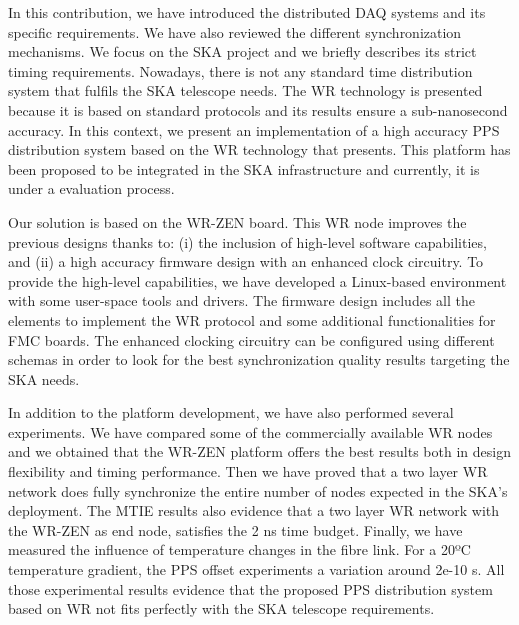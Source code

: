 In this contribution, we have introduced the distributed DAQ systems and its 
specific requirements. We have also reviewed the different synchronization 
mechanisms. We focus on the SKA project and we briefly describes its strict 
timing requirements. Nowadays, there is not any standard time distribution 
system that fulfils the SKA telescope needs. The WR technology is presented 
because it is based on standard protocols and its results ensure a 
sub-nanosecond accuracy. In this context, we present an implementation of a 
high accuracy PPS distribution system based on the WR technology that presents. 
This platform has been proposed to be integrated in the SKA infrastructure and 
currently, it is under a evaluation process. 

Our solution is based on the WR-ZEN board. This WR node improves the previous  
designs thanks to: (i) the inclusion of high-level software capabilities, and 
(ii) a high accuracy firmware design with an enhanced clock circuitry.
To provide the high-level capabilities, we have developed a Linux-based 
environment with some user-space tools and drivers. The firmware design 
includes all the elements to implement the WR protocol and some additional 
functionalities for FMC boards. The enhanced clocking circuitry can be 
configured using different schemas in order to look for the best 
synchronization quality results targeting the SKA needs. 

In addition to the platform development, we have also performed several 
experiments. We have compared some of the commercially available WR nodes and 
we obtained that the WR-ZEN platform offers the best results both in design 
flexibility and timing performance. Then we have proved that a two layer WR 
network does fully synchronize the entire number of nodes expected in the SKA's 
deployment. The MTIE results also evidence that a two layer WR network with the 
WR-ZEN as end node, satisfies the 2 ns time budget. Finally, we have measured 
the influence of temperature changes in the fibre link. For a 20ºC temperature 
gradient, the PPS offset experiments a variation around 2e-10 s.
All those experimental results evidence that the proposed PPS distribution 
system based on WR not fits perfectly with the SKA telescope requirements.


